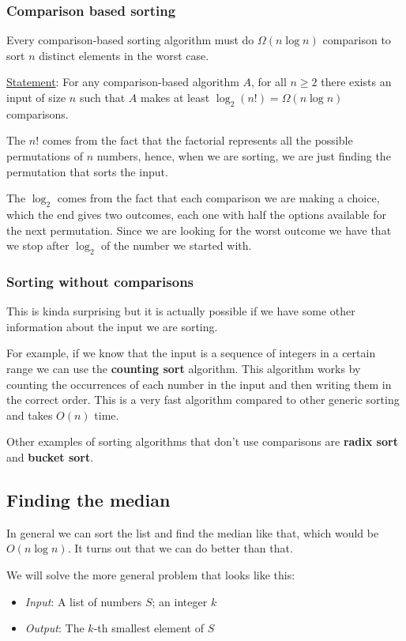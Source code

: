 \documentclass[10pt]{extarticle}
\begin{document}
\subsubsection{Comparison based sorting}

Every comparison-based sorting algorithm
must do $\Omega(n \log n)$ comparison to sort $n$ distinct elements in the worst case.

\underline{Statement}: For any comparison-based algorithm $A$, for all $n \ge 2$ there exists an input of size $n$
such that $A$ makes at least $\log_2(n!) = \Omega(n \log n)$ comparisons.

The $n!$ comes from the fact that the factorial represents all the possible permutations of $n$ numbers,
hence, when we are sorting, we are just finding the  permutation that sorts the input.

The $\log_2$ comes from the fact that each comparison we are making a choice, which the end gives two outcomes,
each one with half the options available for the next permutation.
Since we are looking for the worst outcome we have that we stop after $\log_2$ of the number we started with.

\subsubsection{Sorting without comparisons}

This is kinda surprising but it is actually possible if we have some other information about the input we are sorting.

For example, if we know that the input is a sequence of integers in a certain range we can use the \textbf{counting sort} algorithm.
This algorithm works by counting the occurrences of each number in the input and then writing them in the correct order.
This is a very fast algorithm compared to other generic sorting and takes $O(n)$ time.

Other examples of sorting algorithms that don't use comparisons are \textbf{radix sort} and \textbf{bucket sort}.

\subsection{Finding the median}

In general we can sort the list and find the median like that, which would be $O(n \log n)$.
It turns out that we can do better than that.

We will solve the more general problem that looks like this:
\begin{itemize}
    \item \textit{Input}: A list of numbers $S$; an integer $k$
    \item \textit{Output}: The $k$-th smallest element of $S$
\end{itemize}
\end{document}
